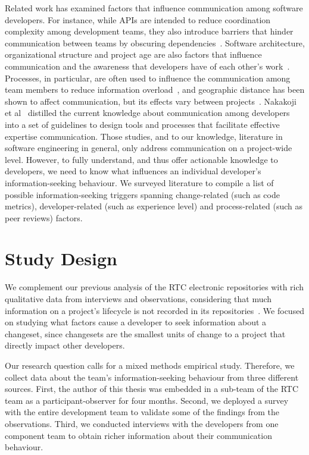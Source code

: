 Related work has examined factors that influence communication among software developers. For instance, while APIs are intended to reduce coordination complexity among development teams, they also introduce barriers that hinder communication between teams by obscuring dependencies~\cite{souza:cscw:2004,desouza:fse:2004}.
Software architecture, organizational structure and project age are also factors that influence communication and the awareness that developers have of each other's work~\cite{cleidson:tse:2011}. 
Processes, in particular, are often used to influence the communication among team members to reduce information overload~\cite{fussell:cscw:1998}, and geographic distance has been shown to affect communication, but its effects vary between projects~\cite{herbsleb:icse:2001,wolf:spip:2008}.
Nakakoji et al~\cite{nakakoji2010:rdc} distilled the current knowledge about communication among developers into a set of guidelines to design tools and processes that facilitate effective expertise communication.
Those studies, and to our knowledge, literature in software engineering in general, only address communication on a project-wide level. However, to fully understand, and thus offer actionable knowledge to developers, we need to know what influences an individual developer's information-seeking behaviour.
We surveyed literature to compile a list of possible information-seeking triggers spanning change-related (such as code metrics), developer-related (such as experience level) and process-related (such as peer reviews) factors.



\section{Study Design}
\label{sec:studydesign}
We complement our previous analysis of the RTC electronic repositories with rich qualitative data from interviews and observations, considering that much information on a project's lifecycle is not recorded in its repositories~\cite{aranda:icse:2009}. We focused on studying what factors cause a developer to seek information about a changeset, since changesets are the smallest units of change to a project that directly impact other developers.

Our research question calls for a mixed methods empirical study. Therefore, we collect data about the team's information-seeking behaviour from three different sources.
First, the author of this thesis was embedded in a sub-team of the RTC team as a participant-observer for four months.
Second, we deployed a survey with the entire development team to validate some of the findings from the observations.
Third, we conducted interviews with the developers from one component team to obtain richer information about their communication behaviour.


